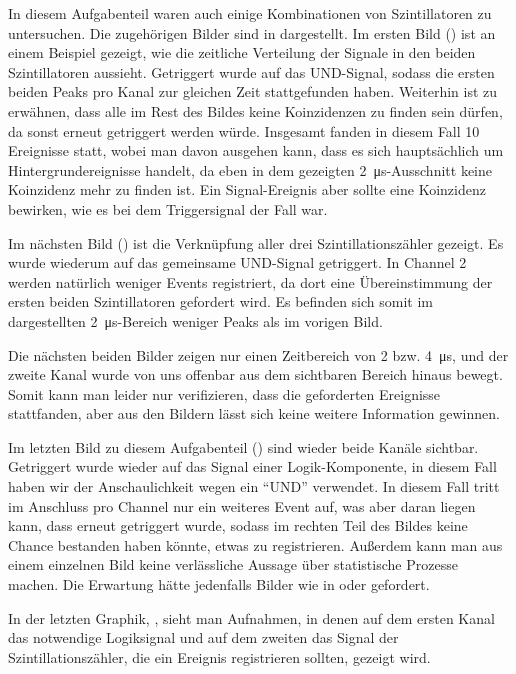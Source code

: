 In diesem Aufgabenteil waren auch einige Kombinationen von Szintillatoren zu
untersuchen. Die zugehörigen Bilder sind in  dargestellt.
Im ersten Bild () ist an einem Beispiel gezeigt, wie die
zeitliche Verteilung der Signale in den beiden Szintillatoren aussieht.
Getriggert wurde auf das UND-Signal, sodass die ersten beiden Peaks pro Kanal
zur gleichen Zeit stattgefunden haben. Weiterhin ist zu erwähnen, dass alle im
Rest des Bildes keine Koinzidenzen zu finden sein dürfen, da sonst erneut
getriggert werden würde. Insgesamt fanden in diesem Fall 10 Ereignisse statt,
wobei man davon ausgehen kann, dass es sich hauptsächlich um
Hintergrundereignisse handelt, da eben in dem gezeigten
\SI{2}{\micro\second}-Ausschnitt keine Koinzidenz mehr zu finden ist. Ein
Signal-Ereignis aber sollte eine Koinzidenz bewirken, wie es bei dem
Triggersignal der Fall war.

Im nächsten Bild () ist die Verknüpfung aller drei
Szintillationszähler gezeigt. Es wurde wiederum auf das gemeinsame UND-Signal
getriggert. In Channel 2 werden natürlich weniger Events registriert, da dort
eine Übereinstimmung der ersten beiden Szintillatoren gefordert wird. Es
befinden sich somit im dargestellten \SI{2}{\micro\second}-Bereich weniger
Peaks als im vorigen Bild. 

Die nächsten beiden Bilder zeigen nur einen Zeitbereich von 2 bzw.
\SI{4}{\micro\second}, und der zweite Kanal wurde von uns offenbar aus dem
sichtbaren Bereich hinaus bewegt. Somit kann man leider nur verifizieren, dass
die geforderten Ereignisse stattfanden, aber aus den Bildern lässt sich keine
weitere Information gewinnen. 

Im letzten Bild zu diesem Aufgabenteil () sind wieder beide
Kanäle sichtbar. Getriggert wurde wieder auf das Signal einer Logik-Komponente,
in diesem Fall haben wir der Anschaulichkeit wegen ein ``UND'' verwendet. In
diesem Fall tritt im Anschluss pro Channel nur ein weiteres Event auf, was aber
daran liegen kann, dass erneut getriggert wurde, sodass im rechten Teil des
Bildes keine Chance bestanden haben könnte, etwas zu registrieren. Außerdem
kann man aus einem einzelnen Bild keine verlässliche Aussage über statistische
Prozesse machen. Die Erwartung hätte jedenfalls Bilder wie in
 oder  gefordert.

In der letzten Graphik, , sieht man Aufnahmen, in denen auf
dem ersten Kanal das notwendige Logiksignal und auf dem zweiten das Signal der
Szintillationszähler, die ein Ereignis registrieren sollten, gezeigt wird.

